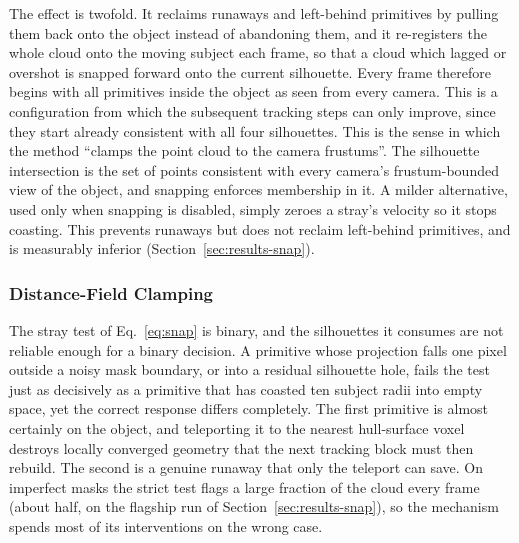 The effect is twofold. It reclaims runaways and left-behind primitives by
pulling them back onto the object instead of abandoning them, and it
re-registers the whole cloud onto the moving subject each frame, so that a
cloud which lagged or overshot is snapped forward onto the current silhouette. Every
frame therefore begins with all primitives inside the object as seen from every camera.
This is a configuration from which the subsequent tracking steps can only improve, since
they start already consistent with all four silhouettes. This is the sense in which
the method \enquote{clamps the point cloud to the camera frustums}. The silhouette
intersection is the set of points consistent with every camera's frustum-bounded view
of the object, and snapping enforces membership in it. A milder alternative, used only
when snapping is disabled, simply zeroes a stray's velocity so it stops coasting. This
prevents runaways but does not reclaim left-behind primitives, and is measurably
inferior (Section~\ref{sec:results-snap}).

\subsubsection{Distance-Field Clamping}
\label{sec:snapmargin}

The stray test of Eq.~\eqref{eq:snap} is binary, and the silhouettes it consumes
are not reliable enough for a binary decision. A primitive whose projection falls one pixel outside a noisy mask
boundary, or into a residual silhouette hole, fails the test just as decisively as a
primitive that has coasted ten subject radii into empty space, yet the correct
response differs completely. The first primitive is almost certainly on the
object, and teleporting it to the nearest hull-surface voxel destroys locally
converged geometry that the next tracking block must then rebuild. The second is a genuine
runaway that only the teleport can save. On imperfect masks the strict test flags a
large fraction of the cloud every frame (about half, on the flagship run of
Section~\ref{sec:results-snap}), so the mechanism spends most of its interventions on
the wrong case.

